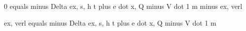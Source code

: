0 equals minus Delta ex, s, h t plus e dot x, Q minus V dot 1 m minus ex, verl  

ex, verl equals minus Delta ex, s, h t plus e dot x, Q minus V dot 1 m